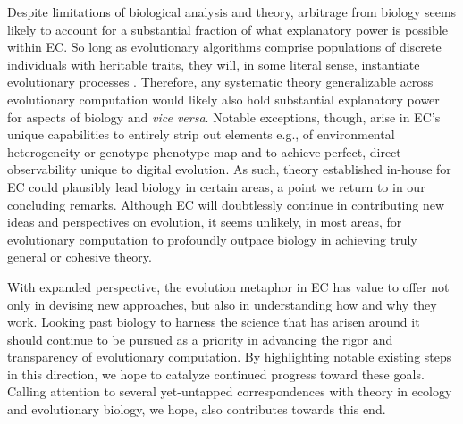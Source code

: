 Despite limitations of biological analysis and theory, arbitrage from biology seems likely to account for a substantial fraction of what explanatory power is possible within EC.
So long as evolutionary algorithms comprise populations of discrete individuals with heritable traits, they will, in some literal sense, instantiate evolutionary processes \citep{pennock2007models}.
Therefore, any systematic theory generalizable across evolutionary computation would likely also hold substantial explanatory power for aspects of biology and \textit{vice versa}.
Notable exceptions, though, arise in EC's unique capabilities to entirely strip out elements e.g., of environmental heterogeneity or genotype-phenotype map and to achieve perfect, direct observability unique to digital evolution.
As such, theory established in-house for EC could plausibly lead biology in certain areas, a point we return to in our concluding remarks.
Although EC will doubtlessly continue in contributing new ideas and perspectives on evolution, it seems unlikely, in most areas, for evolutionary computation to profoundly outpace biology in achieving truly general or cohesive theory.

With expanded perspective, the evolution metaphor in EC has value to offer not only in devising new approaches, but also in understanding how and why they work.
Looking past biology to harness the science that has arisen around it should continue to be pursued as a priority in advancing the rigor and transparency of evolutionary computation.
By highlighting notable existing steps in this direction, we hope to catalyze continued progress toward these goals.
Calling attention to several yet-untapped correspondences with theory in ecology and evolutionary biology, we hope, also contributes towards this end.
